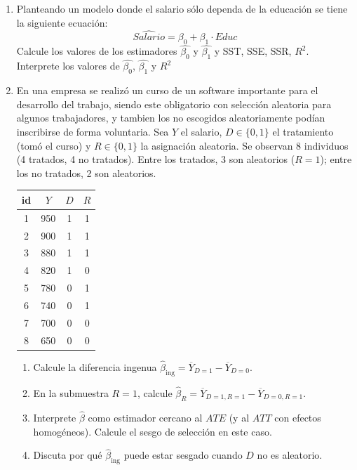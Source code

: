 \documentclass[10pt,a4paper]{article}
\begin{document}
\begin{enumerate}
    \item Planteando un modelo donde el salario sólo dependa de la educación se tiene la siguiente ecuación:
    $$\widehat{Salario} = \beta_0 + \beta_1 \cdot Educ$$
    Calcule los valores de los estimadores $\hat{\beta_0}$ y $\hat{\beta_1}$ y SST, SSE, SSR, $R^2$. Interprete los valores de $\hat{\beta_0}$, $\hat{\beta_1}$ y  $R^2$
    \\
    
 
\item En una empresa se realizó un curso de un software importante para el desarrollo del trabajo, siendo este obligatorio con selección aleatoria para algunos trabajadores, y tambien los no escogidos aleatoriamente podían inscribirse de forma voluntaria.
Sea $Y$ el salario, $D\in\{0,1\}$ el tratamiento (tomó el curso) y $R\in\{0,1\}$ la asignación aleatoria.
Se observan 8 individuos (4 tratados, 4 no tratados). Entre los tratados, 3 son aleatorios ($R=1$); entre los no tratados, 2 son aleatorios.

\begin{center}
\begin{tabular}{|c| c |c |c|}
\hline
id & $Y$ & $D$ & $R$\\
\hline
1 & 950 & 1 & 1\\
2 & 900 & 1 & 1\\
3 & 880 & 1 & 1\\
4 & 820 & 1 & 0\\
5 & 780 & 0 & 1\\
6 & 740 & 0 & 1\\
7 & 700 & 0 & 0\\
8 & 650 & 0 & 0\\
\hline
\end{tabular}
\end{center}

\begin{enumerate}
\item Calcule la diferencia ingenua $\hat\beta_{\text{ing}}=\overline{Y}_{D=1}-\overline{Y}_{D=0}$.

\item En la submuestra $R=1$, calcule $\hat\beta_{R} = \overline{Y}_{D=1,R=1}-\overline{Y}_{D=0,R=1}$.

\item Interprete $\hat\beta$ como estimador cercano al $ATE$ (y al $ATT$ con efectos homogéneos). Calcule el sesgo de selección en este caso.

\item Discuta por qué $\hat\beta_{\text{ing}}$ puede estar sesgado cuando $D$ no es aleatorio.


\end{enumerate}
\end{enumerate}
\end{document}
